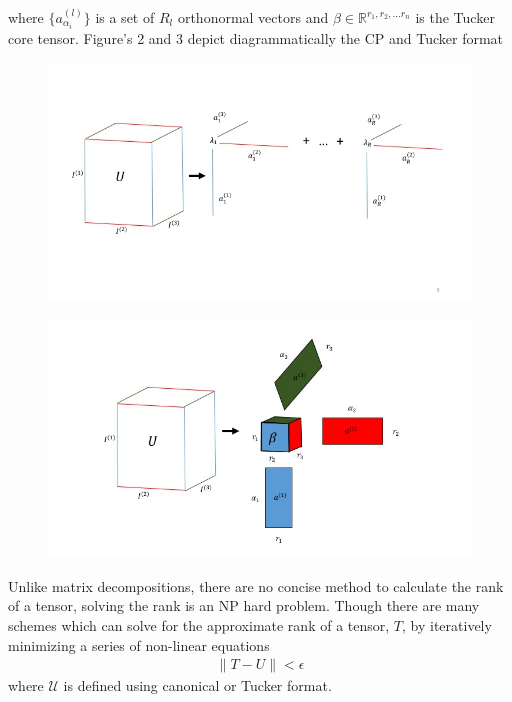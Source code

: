 		where $\{ a_{\alpha_i}^{(l)}\}$ is a set of $R_l$ orthonormal vectors and $\beta \in \mathbb{R}^{r_1,r_2,\dots r_n}$ is the Tucker core tensor. Figure's 2 and 3 depict diagrammatically the CP and Tucker format
	  \begin{figure}
		\centering
			\begin{minipage}{.5\textwidth}
			  \centering
			  \includegraphics[width=1\linewidth]{./pics/CP_picture.jpg}
			  \label{fig:Figure 2}
			\end{minipage}%
			\begin{minipage}{.5\textwidth}
			  \centering
			  \includegraphics[width=1 \linewidth]{./pics/Tucker_picture.jpg}
			  \label{fig:Figure 3}
			\end{minipage}
		\end{figure}

	  Unlike matrix decompositions, there are no concise method to calculate the rank of a tensor, solving the rank is an NP hard problem\cite{Hastad1990}. Though there are many schemes which can solve for the approximate rank of a tensor, $\mathit{T}$, by iteratively minimizing a series of non-linear equations\cite{Kolda2008}
	  	\begin{equation}
	  		\begin{aligned}
	  			\|\mathit{T} - \mathit{U}\| < \epsilon
	  		\end{aligned}
	  	\end{equation}
	  where $\mathcal{U}$ is defined using canonical or Tucker format. 

